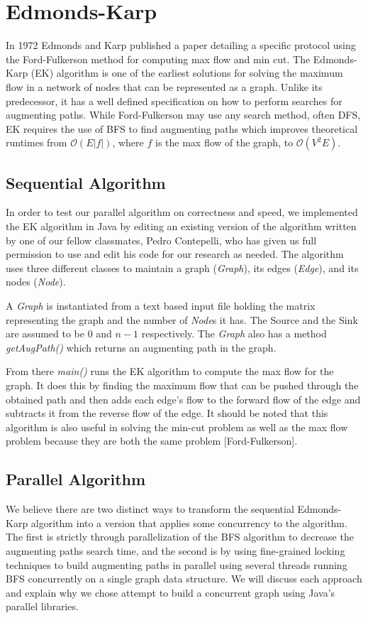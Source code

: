 \section{Edmonds-Karp}
In 1972 Edmonds and Karp published a paper detailing a specific protocol using the Ford-Fulkerson method for computing max flow and min cut. The Edmonds-Karp (EK) algorithm is one of the earliest solutions for solving the maximum flow in a network of nodes that can be represented as a graph. Unlike its predecessor, it has a well defined specification on how to perform searches for augmenting paths. While Ford-Fulkerson may use any search method, often DFS, EK requires the use of BFS to find augmenting paths which improves theoretical runtimes from $\mathcal{O}(E|f|)$, where $f$ is the max flow of the graph, to $\mathcal{O}(V^2E)$.

\subsection{Sequential Algorithm}
In order to test our parallel algorithm on correctness and speed, we implemented the EK algorithm in Java by editing an existing version of the algorithm written by one of our fellow classmates, Pedro Contepelli, who has given us full permission to use and edit his code for our research as needed. The algorithm uses three different classes to maintain a graph (\textit{Graph}), its edges (\textit{Edge}), and its nodes (\textit{Node}).  
    
A \textit{Graph} is instantiated from a text based input file holding the matrix representing the graph and the number of \textit{Node}s it has. The Source and the Sink are assumed to be $0$ and $n-1$ respectively. The \textit{Graph} also has a method \textit{getAugPath()} which returns an augmenting path in the graph.

From there \textit{main()} runs the EK algorithm to compute the max flow for the graph. It does this by finding the maximum flow that can be pushed through the obtained path and then adds each edge's flow to the forward flow of the edge and subtracts it from the reverse flow of the edge. It should be noted that this algorithm is also useful in solving the min-cut problem as well as the max flow problem because they are both the same problem [Ford-Fulkerson].
    
\subsection{Parallel Algorithm}
We believe there are two distinct ways to transform the sequential Edmonds-Karp algorithm into a version that applies some concurrency to the algorithm. The first is strictly through parallelization of the BFS algorithm to decrease the augmenting paths search time, and the second is by using fine-grained locking techniques to build augmenting paths in parallel using several threads running BFS concurrently on a single graph data structure. We will discuss each approach and explain why we chose attempt to build a concurrent graph using Java's parallel libraries.
    
